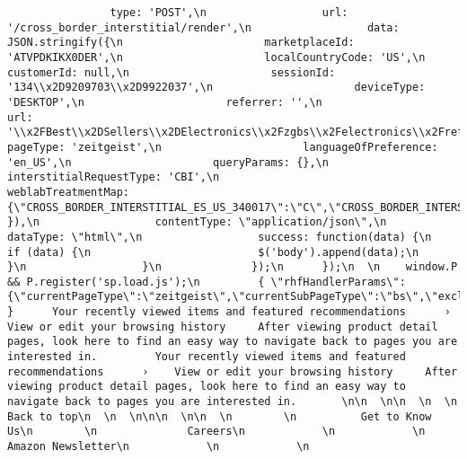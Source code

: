 \documentclass[
]{article}
\begin{document}
\begin{verbatim}
                type: 'POST',\n                  url: '/cross_border_interstitial/render',\n                  data: JSON.stringify({\n                      marketplaceId: 'ATVPDKIKX0DER',\n                      localCountryCode: 'US',\n                         customerId: null,\n                      sessionId: '134\\x2D9209703\\x2D9922037',\n                      deviceType: 'DESKTOP',\n                      referrer: '',\n                      url: '\\x2FBest\\x2DSellers\\x2DElectronics\\x2Fzgbs\\x2Felectronics\\x2Fref\\x3Dzg_bs_nav_0',\n                      pageType: 'zeitgeist',\n                      languageOfPreference: 'en_US',\n                      queryParams: {},\n                      interstitialRequestType: 'CBI',\n                      weblabTreatmentMap: {\"CROSS_BORDER_INTERSTITIAL_ES_US_340017\":\"C\",\"CROSS_BORDER_INTERSTITIAL_MX_US_341718\":\"C\",\"CBI_355055\":\"C\",\"NARX_INTERSTITIAL_NEW_CX_372291\":\"C\",\"MWEB_CROSS_BORDER_INTERSTITIAL_SE_366766\":\"T1\",\"MWEB_CROSS_BORDER_INTERSTITIAL_SA_366767\":\"T1\",\"MWEB_CROSS_BORDER_INTERSTITIAL_PL_366768\":\"T1\",\"MWEB_CROSS_BORDER_INTERSTITIAL_NL_366769\":\"T1\",\"CROSS_BORDER_INTERSTITIAL_US_BR_446277\":\"T1\",\"MWEB_CROSS_BORDER_INTERSTITIAL_BR_457908\":\"T1\",\"MWEB_CROSS_BORDER_INTERSTITIAL_BE_459529\":\"C\",\"CROSS_BORDER_INTERSTITIAL_BE_446276\":\"C\",\"NARX_INTERSTITIAL_AUI_MIGRATION_446901\":\"C\",\"NARX_INTERSTITIAL_CX_IMPROVEMENT_446891\":\"T1\",\"BE_LOP_INTERSTITIAL_460676\":\"T1\",\"TEST_ACS_CONFIGURATION_486322\":\"C\",\"CROSS_BORDER_INTERSTITIAL_ACS_SHADOW_TESTING_486317\":\"C\"}\n                  }),\n                  contentType: \"application/json\",\n                  dataType: \"html\",\n                  success: function(data) {\n                      if (data) {\n                          $('body').append(data);\n                      }\n                  }\n              });\n      });\n  \n    window.P && P.register('sp.load.js');\n         { \"rhfHandlerParams\":{\"currentPageType\":\"zeitgeist\",\"currentSubPageType\":\"bs\",\"excludeAsin\":\"\",\"fieldKeywords\":\"\",\"k\":\"\",\"keywords\":\"\",\"search\":\"\",\"auditEnabled\":\"\",\"previewCampaigns\":\"\",\"forceWidgets\":\"\",\"searchAlias\":\"\"} }      Your recently viewed items and featured recommendations      ›    View or edit your browsing history     After viewing product detail pages, look here to find an easy way to navigate back to pages you are interested in.         Your recently viewed items and featured recommendations      ›    View or edit your browsing history     After viewing product detail pages, look here to find an easy way to navigate back to pages you are interested in.       \n\n  \n\n  \n  \n    Back to top\n  \n  \n\n\n  \n\n  \n        \n          Get to Know Us\n        \n              Careers\n            \n            \n              Amazon Newsletter\n            \n            \n   
\end{verbatim}
\end{document}
